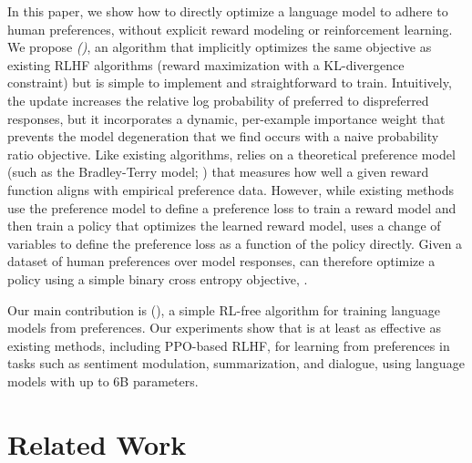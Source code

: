 In this paper, we show how to directly optimize a language model to adhere to human preferences, without explicit reward modeling or reinforcement learning.
We propose
\textit{{\methodfull} (\methodac)}, an algorithm that implicitly optimizes the same objective as existing RLHF algorithms (reward maximization with a KL-divergence constraint) but is simple to implement and straightforward to train. Intuitively, the {\methodac} update increases the relative log probability of preferred to dispreferred responses, but it incorporates a dynamic, per-example importance weight that prevents the model degeneration that we find occurs with a naive probability ratio objective. Like existing algorithms, {\methodac} relies on a theoretical preference model (such as the Bradley-Terry model; \cite{bradley1952rankanalysis}) that measures how well a given reward function aligns with empirical preference data. However, while existing methods use the preference model to define a preference loss to train a reward model and then train a policy that optimizes the learned reward model, {\methodac} uses a change of variables to define the preference loss as a function of the policy directly. Given a dataset of human preferences over model responses, {\methodac} can therefore optimize a policy using a simple binary cross entropy objective, .

Our main contribution is {\methodfull} (\methodac), a simple RL-free algorithm for training language models from preferences. Our experiments show that {\methodac} is at least as effective as existing methods, including PPO-based RLHF, for learning from preferences in tasks such as sentiment modulation, summarization, and dialogue, using language models with up to 6B parameters.

\section{Related Work}







